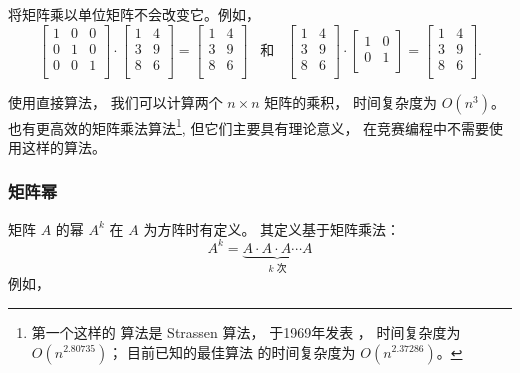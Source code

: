\begin{samepage}
将矩阵乘以单位矩阵不会改变它。例如，
\[
 \begin{bmatrix}
  1 & 0 & 0 \\
  0 & 1 & 0 \\
  0 & 0 & 1 \\
 \end{bmatrix}
\cdot
 \begin{bmatrix}
  1 & 4 \\
  3 & 9 \\
  8 & 6 \\
 \end{bmatrix}
=
 \begin{bmatrix}
  1 & 4 \\
  3 & 9 \\
  8 & 6 \\
 \end{bmatrix} \hspace{10pt} \textrm{和} \hspace{10pt}
 \begin{bmatrix}
  1 & 4 \\
  3 & 9 \\
  8 & 6 \\
 \end{bmatrix}
\cdot
 \begin{bmatrix}
  1 & 0 \\
  0 & 1 \\
 \end{bmatrix}
=
 \begin{bmatrix}
  1 & 4 \\
  3 & 9 \\
  8 & 6 \\
 \end{bmatrix}.
\]
\end{samepage}

使用直接算法，
我们可以计算两个
$n \times n$ 矩阵的乘积，
时间复杂度为 $O(n^3)$。
也有更高效的矩阵乘法算法\footnote{第一个这样的
算法是 Strassen 算法，
于1969年发表 \cite{str69}，
时间复杂度为 $O(n^{2.80735})$；
目前已知的最佳算法 \cite{gal14}
的时间复杂度为 $O(n^{2.37286})$。},
但它们主要具有理论意义，
在竞赛编程中不需要使用这样的算法。


\subsubsection{矩阵幂}


矩阵 $A$ 的幂 $A^k$ 在
$A$ 为方阵时有定义。
其定义基于矩阵乘法：
\[ A^k = \underbrace{A \cdot A \cdot A \cdots A}_{\textrm{$k$ 次}} \]
例如，

